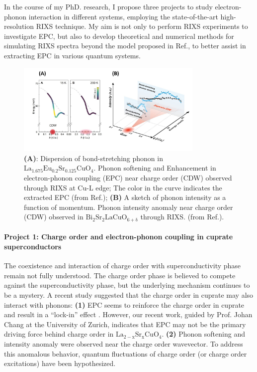 \documentclass[11pt]{article}
\begin{document}
In the course of my PhD. research, I propose three projects to study electron-phonon interaction in different systems, employing the state-of-the-art high-resolution RIXS technique\cite{ament_resonant_2011,zhou_i21_2022}. 
My aim is not only to perform RIXS experiments to investigate EPC, but also to develop theoretical and numerical methods for simulating RIXS spectra beyond the model proposed in Ref.\cite{ament_determining_2011}, to better assist in extracting EPC in various quantum systems.
\begin{figure}[!t]
    \centering
    \includegraphics[width=0.8\textwidth]{figures/new_first_figure.jpg}
    \caption{\textbf{(A)}: Dispersion of bond-stretching phonon in $\mathrm{La_{1.675}Eu_{0.2}Sr_{0.125}CuO_{4}}$. Phonon softening and Enhancement in electron-phonon coupling (EPC) near charge order (CDW) observed through RIXS at Cu-L edge; The color in the curve indicates the extracted EPC (from Ref.\cite{wang_charge_2021}); \textbf{(B)} A sketch of phonon intensity as a function of momentum. Phonon intensity anomaly near charge order (CDW) observed in $\mathrm{Bi_2Sr_2LaCuO_{6+\delta}}$ through RIXS.  (from Ref.\cite{li_multiorbital_2020}).}  
    \label{first_figure}
\end{figure}
\paragraph{Project 1: Charge order and electron-phonon coupling in cuprate superconductors}
The coexistence and interaction of charge order with superconductivity phase remain not fully understood. 
The charge order phase is believed to compete against the superconductivity phase\cite{arpaia_charge_2021,comin_resonant_2016,canosa_resonant_2014, hucker_competing_2014, chang_direct_2012,ghiringhelli_long-range_2012}, but the underlying mechanism continues to be a mystery. 
A recent study suggested that the charge order in cuprate may also interact with phonons: \textbf{(1)} EPC seems to reinforce the charge order in cuprate and result in a ``lock-in'' effect \cite{wang_charge_2021}. However, our recent work, guided by Prof. Johan Chang at the University of Zurich, indicates that EPC may not be the primary driving force behind charge order in $\mathrm{La_{2-x}Sr_xCuO_4}$. \textbf{(2)} Phonon softening and intensity anomaly were observed near the charge order wavevector\cite{wang_charge_2021,lee_spectroscopic_2021, huang_quantum_2021,lin_strongly_2020,li_multiorbital_2020,braicovich_determining_2020,peng_enhanced_2020, miao_incommensurate_2018,chaix_dispersive_2017,tacon_inelastic_2014}. 
To address this anomalous behavior, quantum fluctuations of charge order (or charge order excitations) have been hypothesized\cite{huang_quantum_2021,lee_spectroscopic_2021}.  
\end{document}
